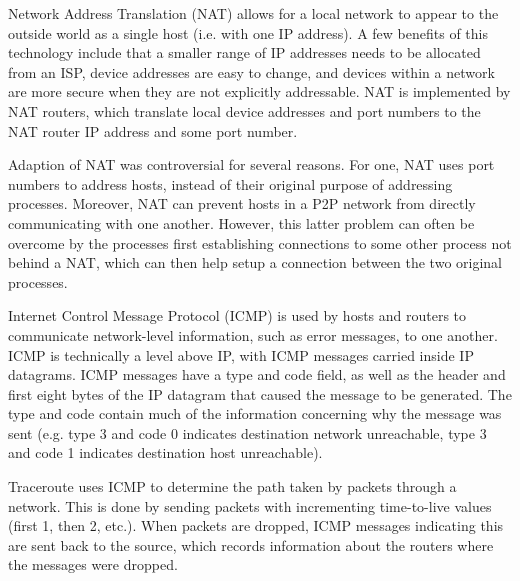 \documentclass[12pt,titlepage]{article}
\begin{document}
        Network Address Translation (NAT) allows for a local network to appear to the outside world as a single host (i.e. with one IP address).
        A few benefits of this technology include that a smaller range of IP addresses needs to be allocated from an ISP, device addresses are easy
        to change, and devices within a network are more secure when they are not explicitly addressable. NAT is implemented by NAT routers, which
        translate local device addresses and port numbers to the NAT router IP address and some port number.

        Adaption of NAT was controversial for several reasons. For one, NAT uses port numbers to address hosts, instead of their original purpose of
        addressing processes. Moreover, NAT can prevent hosts in a P2P network from directly communicating with one another. However, this latter
        problem can often be overcome by the processes first establishing connections to some other process not behind a NAT, which can then help setup
        a connection between the two original processes.

        Internet Control Message Protocol (ICMP) is used by hosts and routers to communicate network-level information, such as error messages, to
        one another. ICMP is technically a level above IP, with ICMP messages carried inside IP datagrams. ICMP messages have a type and code field,
        as well as the header and first eight bytes of the IP datagram that caused the message to be generated. The type and code contain much
        of the information concerning why the message was sent (e.g. type 3 and code 0 indicates destination network unreachable, type 3 and code 1
        indicates destination host unreachable).

        Traceroute uses ICMP to determine the path taken by packets through a network. This is done by sending packets with incrementing time-to-live
        values (first 1, then 2, etc.). When packets are dropped, ICMP messages indicating this are sent back to the source, which records information
        about the routers where the messages were dropped.
\end{document}
